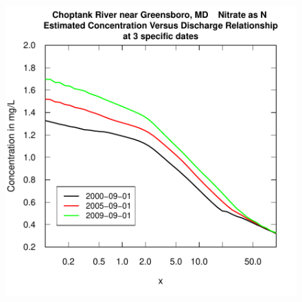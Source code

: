 \documentclass[a4paper,11pt]{article}
\begin{document}
\begin{figure}[htbp]
  \begin{minipage}[h]{0.5\linewidth}
    \begin{center}

\includegraphics{EGRET-figplotConcQSmooth}
    \label{fig:plotConcQSmooth}
    \end{center}
  \end{minipage}
  \begin{minipage}[h]{0.5\linewidth}
    \begin{center}



\end{center}
\end{minipage}
\end{figure}
\end{document}
